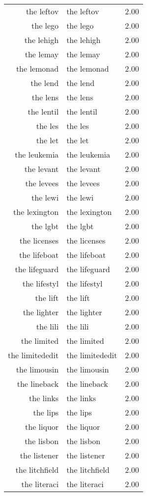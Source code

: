 \begin{table}[ht]
\begin{tabular}{rlr}
  the leftov & the leftov & 2.00 \\ 
  the lego & the lego & 2.00 \\ 
  the lehigh & the lehigh & 2.00 \\ 
  the lemay & the lemay & 2.00 \\ 
  the lemonad & the lemonad & 2.00 \\ 
  the lend & the lend & 2.00 \\ 
  the lens & the lens & 2.00 \\ 
  the lentil & the lentil & 2.00 \\ 
  the les & the les & 2.00 \\ 
  the let & the let & 2.00 \\ 
  the leukemia & the leukemia & 2.00 \\ 
  the levant & the levant & 2.00 \\ 
  the levees & the levees & 2.00 \\ 
  the lewi & the lewi & 2.00 \\ 
  the lexington & the lexington & 2.00 \\ 
  the lgbt & the lgbt & 2.00 \\ 
  the licenses & the licenses & 2.00 \\ 
  the lifeboat & the lifeboat & 2.00 \\ 
  the lifeguard & the lifeguard & 2.00 \\ 
  the lifestyl & the lifestyl & 2.00 \\ 
  the lift & the lift & 2.00 \\ 
  the lighter & the lighter & 2.00 \\ 
  the lili & the lili & 2.00 \\ 
  the limited & the limited & 2.00 \\ 
  the limitededit & the limitededit & 2.00 \\ 
  the limousin & the limousin & 2.00 \\ 
  the lineback & the lineback & 2.00 \\ 
  the links & the links & 2.00 \\ 
  the lips & the lips & 2.00 \\ 
  the liquor & the liquor & 2.00 \\ 
  the lisbon & the lisbon & 2.00 \\ 
  the listener & the listener & 2.00 \\ 
  the litchfield & the litchfield & 2.00 \\ 
  the literaci & the literaci & 2.00 \\ 

\end{tabular}
\end{table}
